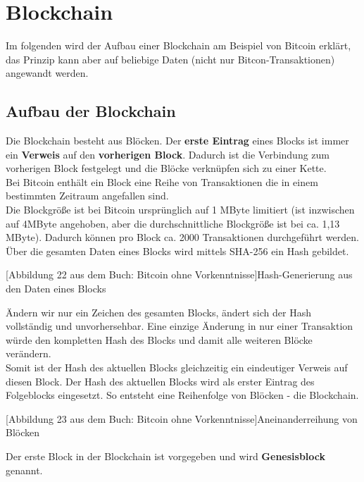 \documentclass[10pt,a4paper,titlepage]{paper}
\begin{document}
\section{Blockchain}
Im folgenden wird der Aufbau einer Blockchain am Beispiel von Bitcoin erklärt, das Prinzip kann aber auf beliebige Daten (nicht nur Bitcon-Transaktionen) angewandt werden.
\subsection{Aufbau der Blockchain}
Die Blockchain besteht aus Blöcken. Der \textbf{erste Eintrag} eines Blocks ist immer ein \textbf{Verweis} auf den \textbf{vorherigen Block}. Dadurch ist die Verbindung zum vorherigen Block festgelegt und die Blöcke verknüpfen sich zu einer Kette.\\
Bei Bitcoin enthält ein Block eine Reihe von Transaktionen die in einem bestimmten Zeitraum angefallen sind.\\
Die Blockgröße ist bei Bitcoin ursprünglich auf 1 MByte limitiert (ist inzwischen auf 4MByte angehoben, aber die durchschnittliche Blockgröße ist bei ca. 1,13 MByte). Dadurch können pro Block ca. 2000 Transaktionen durchgeführt werden.
Über die gesamten Daten eines Blocks wird mittels SHA-256 ein Hash gebildet.
\begin{center}
[Abbildung 22 aus dem Buch: Bitcoin ohne Vorkenntnisse]{Hash-Generierung aus den Daten eines Blocks}
\end{center}
Ändern wir nur ein Zeichen des gesamten Blocks, ändert sich der Hash
vollständig und unvorhersehbar. Eine einzige Änderung in nur einer Transaktion würde den kompletten Hash des Blocks und damit alle weiteren Blöcke verändern.\\
Somit ist der Hash des aktuellen Blocks gleichzeitig ein eindeutiger Verweis auf diesen Block. Der Hash des aktuellen Blocks wird als erster Eintrag des Folgeblocks eingesetzt. So entsteht eine Reihenfolge von Blöcken - die Blockchain.
\begin{center}
[Abbildung 23 aus dem Buch: Bitcoin ohne Vorkenntnisse]{Aneinanderreihung von Blöcken}
\end{center}
Der erste Block in der Blockchain ist vorgegeben und wird \textbf{Genesisblock} genannt. 
\end{document}
